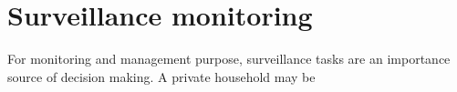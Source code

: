 \section{Surveillance monitoring}
\label{sec:intro-surveillance}

For monitoring and management purpose, surveillance tasks are an importance source of decision making.
A private household may be